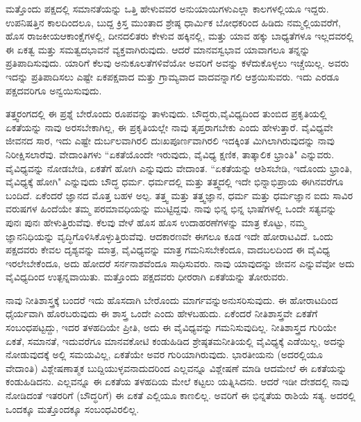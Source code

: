 \vskip 4pt

ಮತ್ತೊಂದು ಪಕ್ಷದಲ್ಲಿ ಸಮಾನತೆಯನ್ನು ಒತ್ತಿ ಹೇಳುವವರ ಅನುಯಾಯಿಗಳು\break ಎಲ್ಲಾ ಕಾಲಗಳಲ್ಲಿಯೂ ಇದ್ದರು. ಉಪನಿಷತ್ತಿನ ಕಾಲದಿಂದಲೂ, ಬುದ್ದ ಕ್ರಿಸ್ತ ಮುಂತಾದ ಶ್ರೇಷ್ಠ ಧಾರ್ಮಿಕ ಬೋಧಕರಿಂದ ಹಿಡಿದು ನಮ್ಮಲ್ಲಿಯವರೆಗೆ, ಹೊಸ ರಾಜಕೀಯ\break ಆಕಾಂಕ್ಷೆಗಳಲ್ಲಿ, ದೀನದಲಿತರು ಕೇಳುವ ಹಕ್ಕಿನಲ್ಲಿ, ಮತ್ತು ಯಾವ ಹಕ್ಕು ಬಾಧ್ಯತೆಗಳೂ ಇಲ್ಲದವರಲ್ಲಿ ಈ ಏಕತ್ವ ಮತ್ತು ಸಮತ್ವದಭಾವನೆ ವ್ಯಕ್ತವಾಗಿರುವುದು. ಆದರೆ ಮಾನವಸ್ವಭಾವ ಯಾವಾಗಲೂ ತನ್ನನ್ನು ಪ್ರತಿಪಾದಿಸುವುದು. ಯಾರಿಗೆ ಕೆಲವು ಅನುಕೂಲತೆಗಳಿವೆಯೋ ಅವರಿಗೆ ಅವನ್ನು ಕಳೆದುಕೊಳ್ಳಲು ಇಚ್ಚೆಯಿಲ್ಲ. ಅವರು ಇದನ್ನು ಪ್ರತಿಪಾದಿಸಲು ಎಷ್ಟೇ ಏಕಪಕ್ಷವಾದ ಮತ್ತು ಗ್ರಾಮ್ಯವಾದ ವಾದವನ್ನಾಗಲಿ ಆಶ್ರಯಿಸುವರು. ಇದು ಎರಡೂ ಪಕ್ಷದವರಿಗೂ ಅನ್ವಯಿಸುವುದು.

\vskip 4pt

ತತ್ತ್ವರಂಗದಲ್ಲಿ ಈ ಪ್ರಶ್ನೆ ಬೇರೊಂದು ರೂಪವನ್ನು ತಾಳುವುದು. ಬೌದ್ಧರು,\break ವೈವಿಧ್ಯದಿಂದ ತುಂಬಿದ ಪ್ರಕೃತಿಯಲ್ಲಿ ಏಕತೆಯನ್ನು ನಾವು ಅರಸಬೇಕಾಗಿಲ್ಲ, ಈ ಪ್ರಕೃತಿಯಲ್ಲೇ ನಾವು ತೃಪ್ತರಾಗಬೇಕು ಎಂದು ಹೇಳುತ್ತಾರೆ. ವೈವಿಧ್ಯವೇ ಜೀವನದ ಸಾರ, ಇದು ಎಷ್ಟೇ ದುರ್ಬಲವಾಗಿರಲಿ ದುಃಖಪೂರ್ಣವಾಗಿರಲಿ ಇದಕ್ಕಿಂತ ಮಿಗಿಲಾಗಿರುವುದನ್ನು ನಾವು ನಿರೀಕ್ಷಿಸಲಾರೆವು. ವೇದಾಂತಿಗಳು “ಏಕತೆಯೊಂದೇ ಇರುವುದು, ವೈವಿಧ್ಯ ಕ್ಷಣಿಕ, ತಾತ್ಕಾಲಿಕ ಭ್ರಾಂತಿ" ಎನ್ನುವರು. ವೈವಿಧ್ಯವನ್ನು ನೋಡಬೇಡಿ, ಏಕತೆಗೆ ಹೋಗಿ ಎನ್ನುವುದು ವೇದಾಂತ. “ಏಕತೆಯನ್ನು ಆಶಿಸಬೇಡಿ, ಇದೊಂದು ಭ್ರಾಂತಿ, ವೈವಿಧ್ಯಕ್ಕೆ ಹೋಗಿ" ಎನ್ನುವುದು ಬೌದ್ಧ ಧರ್ಮ. ಧರ್ಮದಲ್ಲಿ ಮತ್ತು ತತ್ತ್ವದಲ್ಲಿ ಇದೇ ಭಿನ್ನಾಭಿಪ್ರಾಯ ಈಗಿನವರೆಗೂ ಬಂದಿದೆ. ಏಕೆಂದರೆ ಜ್ಞಾನದ ಮೊತ್ತ ಬಹಳ ಅಲ್ಪ. ತತ್ತ್ವ ಮತ್ತು ತತ್ತ್ವಜ್ಞಾನ, ಧರ್ಮ ಮತ್ತು ಧರ್ಮಜ್ಞಾನ ಐದು ಸಾವಿರ ವರುಷಗಳ ಹಿಂದೆಯೇ ತಮ್ಮ ಪರಮಾವಧಿಯನ್ನು ಮುಟ್ಟಿದ್ದವು. ನಾವು ಭಿನ್ನ ಭಿನ್ನ ಭಾಷೆಗಳಲ್ಲಿ ಒಂದೇ ಸತ್ಯವನ್ನು ಪುನಃ ಪುನಃ ಹೇಳುತ್ತಿರುವೆವು. ಕೆಲವು ವೇಳೆ ಹೊಸ ಹೊಸ ಉದಾಹರಣೆಗಳನ್ನು ಮಾತ್ರ ಕೊಟ್ಟು, ನಮ್ಮ ಜ್ಞಾನನಿಧಿಯನ್ನು ವೃದ್ಧಿಗೊಳಿಸಿಕೊಳ್ಳುತ್ತಿರುವೆವು. ಆದಕಾರಣವೇ ಈಗಲೂ ಕೂಡ ಇದೇ ಹೋರಾಟವಿದೆ. ಒಂದು ಪಕ್ಷದವರು ಕೇವಲ ದೃಶ್ಯವನ್ನು ಮಾತ್ರ, ವೈವಿಧ್ಯವನ್ನು ಮಾತ್ರ ಗಮನಿಸಬೇಕೆಂದೂ, ವಾದಬಲದಿಂದ ಈ ವೈವಿಧ್ಯ ಇರಲೇಬೇಕೆಂದೂ, ಅದು ಹೋದರೆ ಸರ್ನನಾಶವೆಂದೂ ಸಾಧಿಸುವರು. ನಾವು ಯಾವುದನ್ನು ಜೀವನ ಎನ್ನುವೆವೋ ಅದು ವೈವಿಧ್ಯದಿಂದ ಉತ್ಪನ್ನವಾಯಿತು. ಮತ್ತೊಂದು ಪಕ್ಷದವರು ಧೀರರಾಗಿ ಏಕತೆಯನ್ನು ತೋರುವರು.

\vskip 4pt

ನಾವು ನೀತಿಶಾಸ್ತ್ರಕ್ಕೆ ಬಂದರೆ ಇದು ಹೊಸದಾಗಿ ಬೇರೊಂದು ಮಾರ್ಗವನ್ನು\break ಅನುಸರಿಸುವುದು. ಈ ಹೋರಾಟದಿಂದ ಧೈರ್ಯವಾಗಿ ಹೊರಬರುವುದು ಈ ಶಾಸ್ತ್ರ ಒಂದೇ ಎಂದು ಹೇಳಬಹುದು. ಏಕೆಂದರೆ ನೀತಿಶಾಸ್ತ್ರವೇ ಏಕತೆಗೆ ಸಂಬಂಧಪಟ್ಟದ್ದು, ಇದರ ತಳಹದಿಯೇ ಪ್ರೀತಿ, ಅದು ಈ ವೈವಿಧ್ಯವನ್ನು ಗಮನಿಸುವುದಿಲ್ಲ. ನೀತಿಶಾಸ್ತ್ರದ ಗುರಿಯೇ ಏಕತೆ, ಸಮಾನತೆ, ಇದುವರೆಗೂ ಮಾನವಕೋಟಿ ಕಂಡುಹಿಡಿದ ಶ್ರೇಷ್ಠತಮನೀತಿಯಲ್ಲಿ ವೈವಿಧ್ಯಕ್ಕೆ ಎಡೆಯಿಲ್ಲ, ಅದನ್ನು ನೋಡುವುದಕ್ಕೆ ಅಲ್ಲಿ ಸಮಯವಿಲ್ಲ, ಏಕತೆಯೇ ಅವರ ಗುರಿಯಾಗಿರುವುದು. ಭಾರತೀಯನು (ಅದರಲ್ಲಿಯೂ ವೇದಾಂತಿ) ವಿಶ್ಲೇಷಣಾತ್ಮಕ ಬುದ್ದಿಯುಳ್ಳವನಾದುದರಿಂದ ಎಲ್ಲವನ್ನೂ ವಿಶ್ಲೇಷಣೆ ಮಾಡಿ ಆದಮೇಲೆ ಈ ಏಕತೆಯನ್ನು ಕಂಡುಹಿಡಿದನು. ಎಲ್ಲವನ್ನೂ ಈ ಏಕತೆಯ ತಳಹದಿಯ ಮೇಲೆ ಕಟ್ಟಲು ಯತ್ನಿಸಿದನು. ಆದರೆ ಇಡೀ ದೇಶದಲ್ಲಿ ನಾವು ನೋಡಿದಂತೆ ಇತರರಿಗೆ (ಬೌದ್ಧರಿಗೆ) ಈ ಏಕತೆ ಎಲ್ಲಿಯೂ ಕಾಣಲಿಲ್ಲ. ಅವರಿಗೆ ಈ ಭಿನ್ನತೆಯ ರಾಶಿಯೆ ಸತ್ಯ. ಅದರಲ್ಲಿ ಒಂದಕ್ಕೂ ಮತ್ತೊಂದಕ್ಕೂ ಸಂಬಂಧವಿರಲಿಲ್ಲ.

